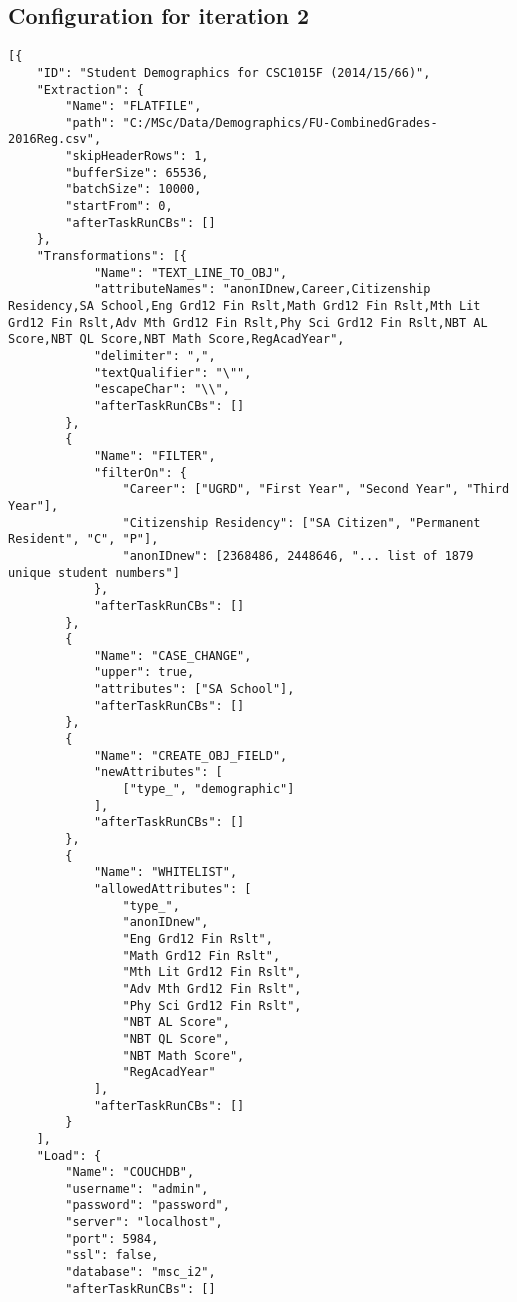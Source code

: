 \subsection{Configuration for iteration 2}
\label{appendix:config-i2}
\begin{verbatim}
[{
    "ID": "Student Demographics for CSC1015F (2014/15/66)",
    "Extraction": {
        "Name": "FLATFILE",
        "path": "C:/MSc/Data/Demographics/FU-CombinedGrades-2016Reg.csv",
        "skipHeaderRows": 1,
        "bufferSize": 65536,
        "batchSize": 10000,
        "startFrom": 0,
        "afterTaskRunCBs": []
    },
    "Transformations": [{
            "Name": "TEXT_LINE_TO_OBJ",
            "attributeNames": "anonIDnew,Career,Citizenship Residency,SA School,Eng Grd12 Fin Rslt,Math Grd12 Fin Rslt,Mth Lit Grd12 Fin Rslt,Adv Mth Grd12 Fin Rslt,Phy Sci Grd12 Fin Rslt,NBT AL Score,NBT QL Score,NBT Math Score,RegAcadYear",
            "delimiter": ",",
            "textQualifier": "\"",
            "escapeChar": "\\",
            "afterTaskRunCBs": []
        },
        {
            "Name": "FILTER",
            "filterOn": {
                "Career": ["UGRD", "First Year", "Second Year", "Third Year"],
                "Citizenship Residency": ["SA Citizen", "Permanent Resident", "C", "P"],
                "anonIDnew": [2368486, 2448646, "... list of 1879 unique student numbers"]
            },
            "afterTaskRunCBs": []
        },
        {
            "Name": "CASE_CHANGE",
            "upper": true,
            "attributes": ["SA School"],
            "afterTaskRunCBs": []
        },
        {
            "Name": "CREATE_OBJ_FIELD",
            "newAttributes": [
                ["type_", "demographic"]
            ],
            "afterTaskRunCBs": []
        },
        {
            "Name": "WHITELIST",
            "allowedAttributes": [
                "type_",
                "anonIDnew",
                "Eng Grd12 Fin Rslt",
                "Math Grd12 Fin Rslt",
                "Mth Lit Grd12 Fin Rslt",
                "Adv Mth Grd12 Fin Rslt",
                "Phy Sci Grd12 Fin Rslt",
                "NBT AL Score",
                "NBT QL Score",
                "NBT Math Score",
                "RegAcadYear"
            ],
            "afterTaskRunCBs": []
        }
    ],
    "Load": {
        "Name": "COUCHDB",
        "username": "admin",
        "password": "password",
        "server": "localhost",
        "port": 5984,
        "ssl": false,
        "database": "msc_i2",
        "afterTaskRunCBs": []

\end{verbatim}
